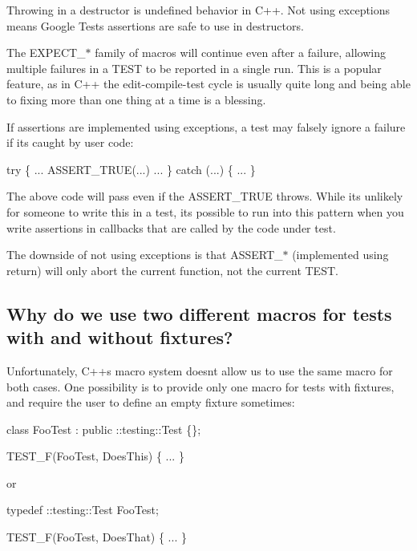 \begin{DoxyEnumerate}
\item Throwing in a destructor is undefined behavior in C++. Not using exceptions means Google Test\textquotesingle{}s assertions are safe to use in destructors.
\end{DoxyEnumerate}
\begin{DoxyEnumerate}
\item The {\ttfamily E\+X\+P\+E\+C\+T\+\_\+$\ast$} family of macros will continue even after a failure, allowing multiple failures in a {\ttfamily T\+E\+ST} to be reported in a single run. This is a popular feature, as in C++ the edit-\/compile-\/test cycle is usually quite long and being able to fixing more than one thing at a time is a blessing.
\end{DoxyEnumerate}
\begin{DoxyEnumerate}
\item If assertions are implemented using exceptions, a test may falsely ignore a failure if it\textquotesingle{}s caught by user code\+: 
\begin{DoxyCode}
try \{ ... ASSERT\_TRUE(...) ... \}
catch (...) \{ ... \}
\end{DoxyCode}
 The above code will pass even if the {\ttfamily A\+S\+S\+E\+R\+T\+\_\+\+T\+R\+UE} throws. While it\textquotesingle{}s unlikely for someone to write this in a test, it\textquotesingle{}s possible to run into this pattern when you write assertions in callbacks that are called by the code under test.
\end{DoxyEnumerate}

The downside of not using exceptions is that {\ttfamily A\+S\+S\+E\+R\+T\+\_\+$\ast$} (implemented using {\ttfamily return}) will only abort the current function, not the current {\ttfamily T\+E\+ST}.

\subsection*{Why do we use two different macros for tests with and without fixtures?}

Unfortunately, C++\textquotesingle{}s macro system doesn\textquotesingle{}t allow us to use the same macro for both cases. One possibility is to provide only one macro for tests with fixtures, and require the user to define an empty fixture sometimes\+:


\begin{DoxyCode}
class FooTest : public ::testing::Test \{\};

TEST\_F(FooTest, DoesThis) \{ ... \}
\end{DoxyCode}
 or 
\begin{DoxyCode}
typedef ::testing::Test FooTest;

TEST\_F(FooTest, DoesThat) \{ ... \}
\end{DoxyCode}


